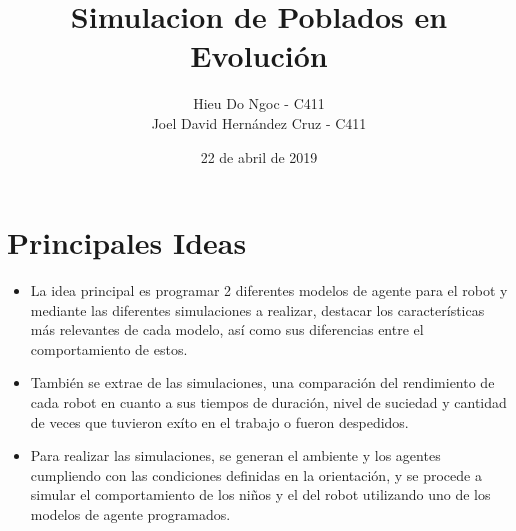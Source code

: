\documentclass[12pt]{article}
\title{Simulacion de Poblados en Evoluci\'on}
\author{Hieu Do Ngoc - C411 \\ Joel David Hern\'andez Cruz - C411}
\date{22 de abril de 2019}
\begin{document}
\maketitle
\newpage

\section{Principales Ideas} 
\begin{itemize}
	\item La idea principal es programar 2 diferentes modelos de agente 
	para el robot y mediante las diferentes simulaciones a realizar, destacar
	los caracter\'isticas m\'as relevantes de cada modelo, as\'i como 
	sus diferencias entre el comportamiento de estos.
	\item Tambi\'en se extrae de las simulaciones, una comparaci\'on del 
	rendimiento de	cada robot en cuanto a sus tiempos de duraci\'on, nivel 
	de	suciedad y cantidad de veces que tuvieron ex\'ito en el trabajo o fueron
	despedidos.
	\item Para realizar las simulaciones, se generan el ambiente y los agentes
	cumpliendo con las condiciones definidas en la orientaci\'on, y se procede 
	a simular el comportamiento de los ni\~nos y el del robot utilizando uno de 
	los modelos de agente programados.	
\end{itemize}
\end{document}
